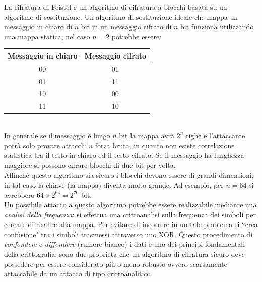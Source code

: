 La cifratura di Feistel è un algoritmo di cifratura a blocchi basata su un algoritmo di sostituzione. Un algoritmo di sostituzione ideale che mappa un messaggio in chiaro di $n$ bit in un messaggio cifrato di $n$ bit funziona utilizzando una mappa statica; nel caso $n=2$ potrebbe essere:
\begin{table}[h]
	\centering
	\begin{tabular}{c|c}
		\toprule[0.5ex]
		Messaggio in chiaro & Messaggio cifrato \\
		\midrule
		00 & 01 \\
		01 & 11 \\
		10 & 00 \\
		11 & 10 \\
		\bottomrule[0.5ex]
	\end{tabular}
\end{table}\\
In generale se il messaggio è lungo $n$ bit la mappa avrà $2^n$ righe e l'attaccante potrà solo provare attacchi a forza bruta, in quanto non esiste correlazione statistica tra il testo in chiaro ed il testo cifrato. Se il messaggio ha lunghezza maggiore si possono cifrare blocchi di due bit per volta.\\
Affinché questo algoritmo sia sicuro i blocchi devono essere di grandi dimensioni, in tal caso la chiave (la mappa) diventa molto grande. Ad esempio, per $n=64$ si avrebbero $64 \times 2^{64} = 2^{70}$ bit.\\
Un possibile attacco a questo algoritmo potrebbe essere realizzabile mediante una \textit{analisi della frequenza}: si effettua una crittoanalisi sulla frequenza dei simboli per cercare di risalire alla mappa. Per evitare di incorrere in un tale problema si \textquotedblleft crea confusione" tra i simboli trasmessi attraverso uno XOR. Questo procedimento di \textit{confondere} e \textit{diffondere} (rumore bianco) i dati è uno dei principi fondamentali della crittografia: sono due proprietà che un algoritmo di cifratura sicuro deve possedere per essere considerato più o meno robusto ovvero scarsamente attaccabile da un attacco di tipo crittoanalitico.
